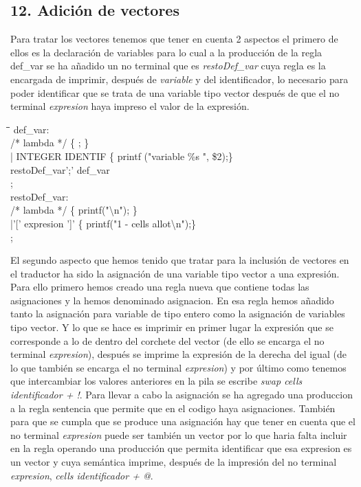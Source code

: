 \documentclass[11pt,spanish]{article}
\begin{document}
		\subsection*{12. Adición de vectores}
		Para tratar los vectores tenemos que tener en cuenta 2 aspectos el primero de ellos es la declaración de variables para lo cual a la producción de la regla {\ttfamily def\_var} se ha añadido un no terminal que es \textit {restoDef\_var} cuya regla es la encargada de imprimir, después de \textit {variable} y del identificador, lo necesario para poder identificar que se trata de una variable tipo vector después de que el no terminal \textit {expresion} haya impreso el valor de la expresión.
		\begin{tabbing}
            \hspace*{1cm}\=\hspace*{1cm}\= \hspace*{4cm}\=\kill
			def\_var:   \\           
				\> /* lambda */\> \>		\{ ; \}\\
				 \>| INTEGER IDENTIF\> \> \{ printf ("variable \%s ", \$2);\} \\
				 \>restoDef\_var';' def\_var\\
			 ;\\
			 
			restoDef\_var:\\
					\> /* lambda */ \> \>		\{ printf("\textbackslash n"); \} \\
					\>|'[' expresion ']'\> \>	\{ printf("1 - cells allot\textbackslash n");\} \\
			;
			
		\end{tabbing}
		El segundo aspecto que hemos tenido que tratar para la inclusión de vectores en el traductor ha sido la asignación de una variable tipo vector a una expresión. Para ello primero hemos creado una regla nueva que contiene todas las asignaciones y la hemos denominado {\ttfamily asignacion}. En esa regla hemos añadido tanto la asignación para variable de tipo entero como la asignación de variables tipo vector. Y lo que se hace es imprimir en primer lugar la expresión que se corresponde a lo de dentro del corchete del vector (de ello se encarga el no terminal \textit {expresion}), después se imprime la expresión de la derecha del igual (de lo que también se encarga el no terminal \textit {expresion}) y por último como tenemos que intercambiar los valores anteriores en la pila se escribe \textit{swap cells identificador + !}. Para llevar a cabo la asignación se ha agregado una produccion a la regla {\ttfamily sentencia} que permite que en el codigo haya asignaciones. También para que se cumpla que se produce una asignación hay que tener en cuenta que el no terminal \textit{expresion} puede ser también un vector por lo que haria falta incluir en la regla {\ttfamily operando} una producción que permita identificar que esa expresion es un vector y cuya semántica imprime, después de la impresión del no terminal \textit{expresion}, \textit{cells identificador + @}.
\end{document}
